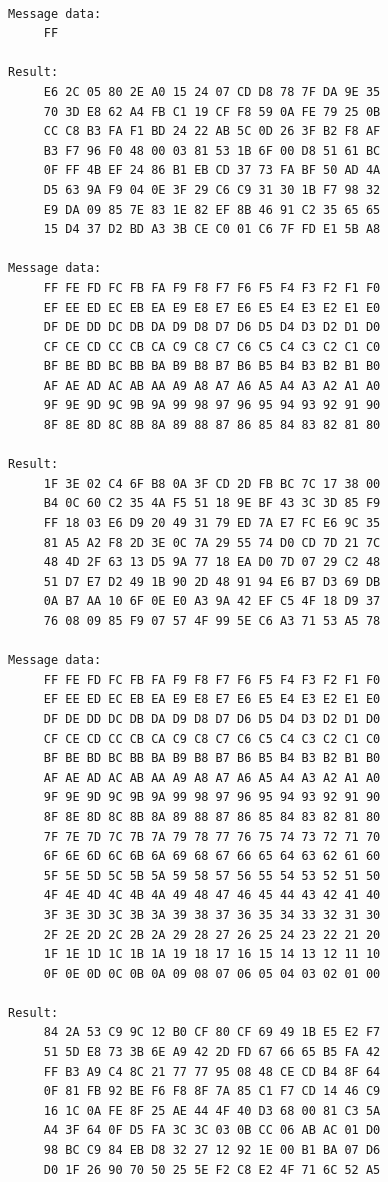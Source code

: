 \documentclass[11pt,twoside]{article}
\begin{document}
\begin{verbatim}

Message data:
     FF

Result:
     E6 2C 05 80 2E A0 15 24 07 CD D8 78 7F DA 9E 35
     70 3D E8 62 A4 FB C1 19 CF F8 59 0A FE 79 25 0B
     CC C8 B3 FA F1 BD 24 22 AB 5C 0D 26 3F B2 F8 AF
     B3 F7 96 F0 48 00 03 81 53 1B 6F 00 D8 51 61 BC
     0F FF 4B EF 24 86 B1 EB CD 37 73 FA BF 50 AD 4A
     D5 63 9A F9 04 0E 3F 29 C6 C9 31 30 1B F7 98 32
     E9 DA 09 85 7E 83 1E 82 EF 8B 46 91 C2 35 65 65
     15 D4 37 D2 BD A3 3B CE C0 01 C6 7F FD E1 5B A8

Message data:
     FF FE FD FC FB FA F9 F8 F7 F6 F5 F4 F3 F2 F1 F0
     EF EE ED EC EB EA E9 E8 E7 E6 E5 E4 E3 E2 E1 E0
     DF DE DD DC DB DA D9 D8 D7 D6 D5 D4 D3 D2 D1 D0
     CF CE CD CC CB CA C9 C8 C7 C6 C5 C4 C3 C2 C1 C0
     BF BE BD BC BB BA B9 B8 B7 B6 B5 B4 B3 B2 B1 B0
     AF AE AD AC AB AA A9 A8 A7 A6 A5 A4 A3 A2 A1 A0
     9F 9E 9D 9C 9B 9A 99 98 97 96 95 94 93 92 91 90
     8F 8E 8D 8C 8B 8A 89 88 87 86 85 84 83 82 81 80

Result:
     1F 3E 02 C4 6F B8 0A 3F CD 2D FB BC 7C 17 38 00
     B4 0C 60 C2 35 4A F5 51 18 9E BF 43 3C 3D 85 F9
     FF 18 03 E6 D9 20 49 31 79 ED 7A E7 FC E6 9C 35
     81 A5 A2 F8 2D 3E 0C 7A 29 55 74 D0 CD 7D 21 7C
     48 4D 2F 63 13 D5 9A 77 18 EA D0 7D 07 29 C2 48
     51 D7 E7 D2 49 1B 90 2D 48 91 94 E6 B7 D3 69 DB
     0A B7 AA 10 6F 0E E0 A3 9A 42 EF C5 4F 18 D9 37
     76 08 09 85 F9 07 57 4F 99 5E C6 A3 71 53 A5 78

Message data:
     FF FE FD FC FB FA F9 F8 F7 F6 F5 F4 F3 F2 F1 F0
     EF EE ED EC EB EA E9 E8 E7 E6 E5 E4 E3 E2 E1 E0
     DF DE DD DC DB DA D9 D8 D7 D6 D5 D4 D3 D2 D1 D0
     CF CE CD CC CB CA C9 C8 C7 C6 C5 C4 C3 C2 C1 C0
     BF BE BD BC BB BA B9 B8 B7 B6 B5 B4 B3 B2 B1 B0
     AF AE AD AC AB AA A9 A8 A7 A6 A5 A4 A3 A2 A1 A0
     9F 9E 9D 9C 9B 9A 99 98 97 96 95 94 93 92 91 90
     8F 8E 8D 8C 8B 8A 89 88 87 86 85 84 83 82 81 80
     7F 7E 7D 7C 7B 7A 79 78 77 76 75 74 73 72 71 70
     6F 6E 6D 6C 6B 6A 69 68 67 66 65 64 63 62 61 60
     5F 5E 5D 5C 5B 5A 59 58 57 56 55 54 53 52 51 50
     4F 4E 4D 4C 4B 4A 49 48 47 46 45 44 43 42 41 40
     3F 3E 3D 3C 3B 3A 39 38 37 36 35 34 33 32 31 30
     2F 2E 2D 2C 2B 2A 29 28 27 26 25 24 23 22 21 20
     1F 1E 1D 1C 1B 1A 19 18 17 16 15 14 13 12 11 10
     0F 0E 0D 0C 0B 0A 09 08 07 06 05 04 03 02 01 00

Result:
     84 2A 53 C9 9C 12 B0 CF 80 CF 69 49 1B E5 E2 F7
     51 5D E8 73 3B 6E A9 42 2D FD 67 66 65 B5 FA 42
     FF B3 A9 C4 8C 21 77 77 95 08 48 CE CD B4 8F 64
     0F 81 FB 92 BE F6 F8 8F 7A 85 C1 F7 CD 14 46 C9
     16 1C 0A FE 8F 25 AE 44 4F 40 D3 68 00 81 C3 5A
     A4 3F 64 0F D5 FA 3C 3C 03 0B CC 06 AB AC 01 D0
     98 BC C9 84 EB D8 32 27 12 92 1E 00 B1 BA 07 D6
     D0 1F 26 90 70 50 25 5E F2 C8 E2 4F 71 6C 52 A5
\end{verbatim}
\end{document}
